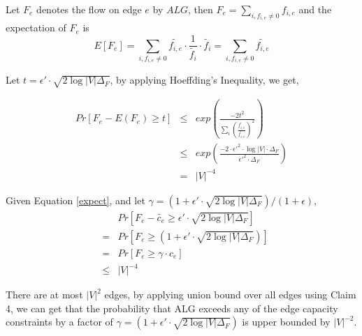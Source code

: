 \documentclass[onecolumn,11pt,journal, compsoc]{IEEEtran}
\begin{document}
Let $F_e$ denotes the flow on edge $e$ by $ALG$, then $F_e = \sum_{i, f_{i,e} \neq 0}{f_{i,e}}$ and the expectation of $F_e$ is 
\begin{equation} \label{expect}
E[F_e] = \sum_{i, f_{i,e} \neq 0}\tilde{f_{i,e}} \cdot \frac{1}{\tilde{f_i}} \cdot  \tilde{f_i} = \sum_{i, f_{i,e} \neq 0}\tilde{f_{i,e}}
\end{equation}



Let $t=\epsilon' \cdot \sqrt{2\log|V|\Delta_F}$, by applying Hoeffding's Inequality, we get,
	
\begin{eqnarray}
Pr[F_e - E(F_e) \ge t] &\le& exp(\frac{-2t^2}{\sum_{i}(\frac{\tilde{f_{i,e}}}{\tilde{f_{i,e}}})^2}) \\
&\le& exp(\frac{-2 \cdot \epsilon'^2 \cdot \log|V| \cdot \Delta_F}{\epsilon'^2 \cdot\Delta_F}) \\
&=& |V|^{-4}
\end{eqnarray}


Given Equation \ref{expect}, and let $\gamma = (1+\epsilon' \cdot \sqrt{2\log|V|\Delta_F})/ (1+\epsilon)$,
\begin{eqnarray}
	&&Pr[F_e - \tilde{c_e} \ge \epsilon' \cdot \sqrt{2\log|V|\Delta_F}] \\
	&=& Pr[F_e \ge (1+\epsilon' \cdot \sqrt{2\log|V|\Delta_F})] \\
	&=& Pr[F_e \ge \gamma \cdot c_e] \\
	&\le& |V|^{-4}
\end{eqnarray}

%

There are at most $|V|^2$ edges, by applying union bound over all edges using Claim 4, we can get that the probability that ALG exceeds any of the edge capacity constraints by a factor of $\gamma = (1+\epsilon' \cdot \sqrt{2\log|V|\Delta_F})$ is upper bounded by $|V|^{-2}$.
\end{document}
